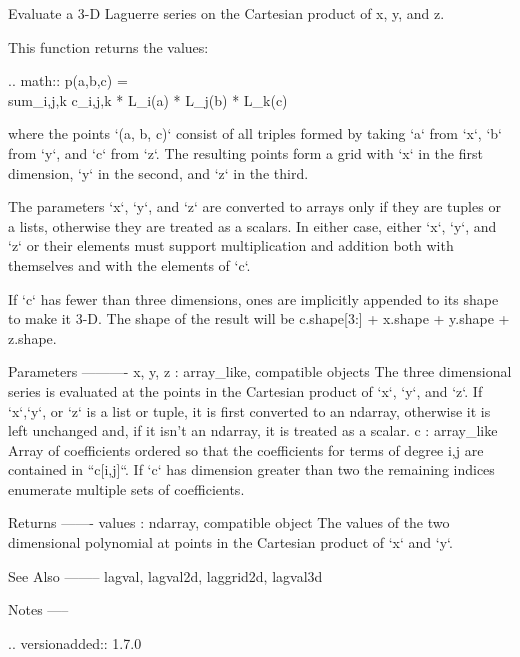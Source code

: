 \begin{DoxyVerb}Evaluate a 3-D Laguerre series on the Cartesian product of x, y, and z.

This function returns the values:

.. math:: p(a,b,c) = \\sum_{i,j,k} c_{i,j,k} * L_i(a) * L_j(b) * L_k(c)

where the points `(a, b, c)` consist of all triples formed by taking
`a` from `x`, `b` from `y`, and `c` from `z`. The resulting points form
a grid with `x` in the first dimension, `y` in the second, and `z` in
the third.

The parameters `x`, `y`, and `z` are converted to arrays only if they
are tuples or a lists, otherwise they are treated as a scalars. In
either case, either `x`, `y`, and `z` or their elements must support
multiplication and addition both with themselves and with the elements
of `c`.

If `c` has fewer than three dimensions, ones are implicitly appended to
its shape to make it 3-D. The shape of the result will be c.shape[3:] +
x.shape + y.shape + z.shape.

Parameters
----------
x, y, z : array_like, compatible objects
    The three dimensional series is evaluated at the points in the
    Cartesian product of `x`, `y`, and `z`.  If `x`,`y`, or `z` is a
    list or tuple, it is first converted to an ndarray, otherwise it is
    left unchanged and, if it isn't an ndarray, it is treated as a
    scalar.
c : array_like
    Array of coefficients ordered so that the coefficients for terms of
    degree i,j are contained in ``c[i,j]``. If `c` has dimension
    greater than two the remaining indices enumerate multiple sets of
    coefficients.

Returns
-------
values : ndarray, compatible object
    The values of the two dimensional polynomial at points in the Cartesian
    product of `x` and `y`.

See Also
--------
lagval, lagval2d, laggrid2d, lagval3d

Notes
-----

.. versionadded:: 1.7.0\end{DoxyVerb}
 \mbox{\label{namespacenumpy_1_1polynomial_1_1laguerre_a51b52ca92eaa29ce35e3344e5a3254c6}} 
